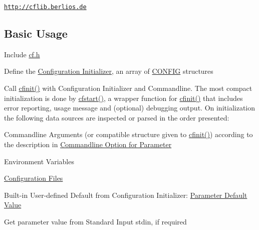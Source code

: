 \begin{DoxyItemize}
\item \href{http://cflib.berlios.de}{\tt http\-://cflib.\-berlios.\-de}
\end{DoxyItemize}\hypertarget{index_basic_usage}{}\subsection{Basic Usage}\label{index_basic_usage}

\begin{DoxyEnumerate}
\item Include \hyperlink{cf_8h}{cf.\-h}
\end{DoxyEnumerate}


\begin{DoxyEnumerate}
\item Define the \hyperlink{config_initializer}{Configuration Initializer}, an array of \hyperlink{struct_c_o_n_f_i_g}{C\-O\-N\-F\-I\-G} structures
\end{DoxyEnumerate}


\begin{DoxyEnumerate}
\item Call \hyperlink{group__cflib__core_ga64fb341565c2ddfccd6669e5e6265a8a}{cfinit()} with Configuration Initializer and Commandline. The most compact initialization is done by \hyperlink{group__cflib__core_ga6e04a462f9ad273de914af386ff15623}{cfstart()}, a wrapper function for \hyperlink{group__cflib__core_ga64fb341565c2ddfccd6669e5e6265a8a}{cfinit()} that includes error reporting, usage message and (optional) debugging output. On initialization the following data sources are inspected or parsed in the order presented\-:
\end{DoxyEnumerate}


\begin{DoxyItemize}
\item Commandline Arguments (or compatible structure given to \hyperlink{group__cflib__core_ga64fb341565c2ddfccd6669e5e6265a8a}{cfinit()}) according to the description in \hyperlink{config_initializer_parameter_option}{Commandline Option for Parameter}
\begin{DoxyItemize}
\item Environment Variables
\item \hyperlink{config_files}{Configuration Files}
\item Built-\/in User-\/defined Default from Configuration Initializer\-: \hyperlink{config_initializer_parameter_default}{Parameter Default Value}
\item Get parameter value from Standard Input {\ttfamily stdin}, if required
\end{DoxyItemize}
\end{DoxyItemize}


